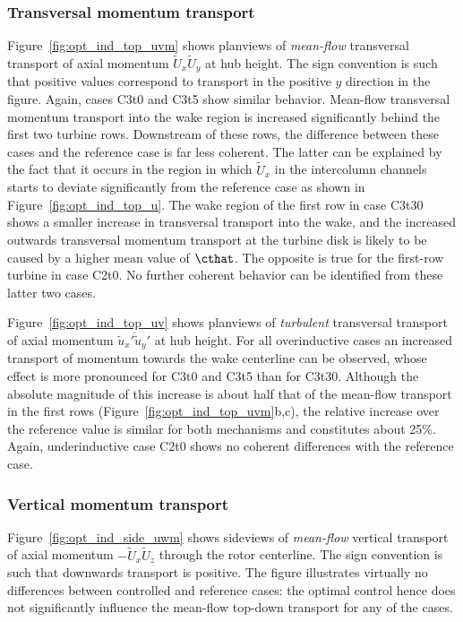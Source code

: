 	\FloatBarrier
	\subsubsection{Transversal momentum transport}
	
		Figure~\ref{fig:opt_ind_top_uvm} shows planviews of  \emph{mean-flow} transversal transport of axial momentum $\widetilde{U}_x \widetilde{U}_y$ at hub height. The sign convention is such that positive values correspond to transport in the positive $y$ direction in the figure. Again, cases C3t0 and C3t5 show similar behavior. Mean-flow transversal momentum transport into the wake region is increased significantly behind the first two turbine rows. Downstream of these rows, the difference between these cases and the reference case is far less coherent. The latter can be explained by the fact that it occurs in the region in which $\widetilde{U}_x$ in the intercolumn channels starts to deviate significantly from the reference case as shown in Figure~\ref{fig:opt_ind_top_u}. The wake region of the first row in case C3t30 shows a smaller increase in transversal transport into the wake, and the increased outwards transversal momentum transport at the turbine disk is likely to be caused by a higher mean value of $\cthat$. The opposite is true for the first-row turbine in case C2t0. No further coherent behavior can be identified from these latter two cases.
	
		Figure~\ref{fig:opt_ind_top_uv} shows planviews of \emph{turbulent} transversal transport of axial momentum $\overline{\widetilde{u}_x' \widetilde{u}_y'}$ at hub height. For all overinductive cases an increased transport of momentum towards the wake centerline can be observed, whose effect is more pronounced for C3t0 and C3t5 than for C3t30. Although the absolute magnitude of this increase is about half that of the mean-flow transport in the first rows (Figure~\ref{fig:opt_ind_top_uvm}b,c), the relative increase over the reference value is similar for both mechanisms and constitutes about 25\%. Again, underinductive case C2t0 shows no coherent differences with the reference case. 
	

	
	
	\subsubsection{Vertical momentum transport}

	Figure~\ref{fig:opt_ind_side_uwm} shows sideviews of \emph{mean-flow} vertical transport of axial momentum $- \widetilde{U}_x \widetilde{U}_z$ through the rotor centerline. The sign convention is such that downwards transport is positive. The figure illustrates virtually no differences between controlled and reference cases: the optimal control hence does not significantly influence the mean-flow top-down transport for any of the cases.

